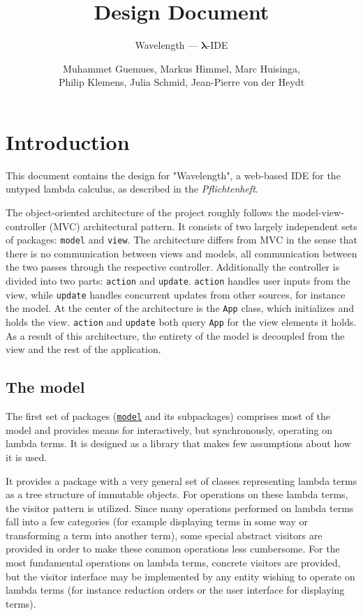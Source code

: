 \documentclass[a4paper, parskip=half]{scrartcl}
\title{Design Document}
\subtitle{Wavelength --- $\bm{\lambda}$-IDE}
\author{Muhammet Guemues, Markus Himmel, Marc Huisinga,\\Philip Klemens, Julia Schmid, Jean-Pierre von der Heydt}
\newcommand{\pkglnk}[1]{\hyperref[pkg:edu.kit.wavelength.client.#1]{#1}}
\begin{document}
\maketitle
\thispagestyle{empty}
\newpage
\tableofcontents
\newpage
\section{Introduction}

This document contains the design for "Wavelength", a web-based IDE for the untyped
lambda calculus, as described in the \textit{Pflichtenheft}.

The object-oriented architecture of the project roughly follows the model-view-controller (MVC)
architectural pattern. It consists of two largely independent sets of packages: \texttt{model} and \texttt{view}.
The architecture differs from MVC in the sense that there is no communication between views and models, 
all communication between the two passes through the respective controller. 
Additionally the controller is divided into two parts: \texttt{action} and \texttt{update}. 
\texttt{action} handles user inputs from the view, while \texttt{update} handles concurrent updates from other sources, for instance the model.
At the center of the architecture is the \texttt{App} class, which initializes and holds the view. 
\texttt{action} and \texttt{update} both query \texttt{App} for the view elements it holds.
As a result of this architecture, the entirety of the model is decoupled from the view and the rest of the application.


\subsection{The model}

The first set of packages (\texttt{\pkglnk{model}} and its subpackages) comprises most of the model and provides means for interactively, but
synchronously, operating on lambda terms. It is designed as a library that makes few
assumptions about how it is used.

It provides a package with a very general set of classes representing
lambda terms as a tree structure of immutable objects. For operations on these lambda
terms, the visitor pattern is utilized. Since many operations performed on lambda terms
fall into a few categories (for example displaying terms in some way or transforming a term
into another term), some special abstract visitors are provided in order to make these common
operations less cumbersome. For the most fundamental operations on lambda terms, concrete
visitors are provided, but the visitor interface may be implemented by any entity wishing
to operate on lambda terms (for instance reduction orders or the user interface for displaying
terms).
\end{document}
